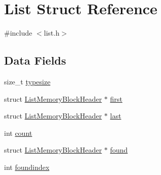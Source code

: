 \hypertarget{struct_list}{\section{List Struct Reference}
\label{struct_list}
}


{\ttfamily \#include $<$list.\-h$>$}

\subsection*{Data Fields}
\begin{DoxyCompactItemize}
\item 
size\-\_\-t \hyperlink{struct_list_aae15b6d77b58dbd6f21861d1320ec961}{typesize}
\item 
struct \hyperlink{struct_list_memory_block_header}{List\-Memory\-Block\-Header} $\ast$ \hyperlink{struct_list_aad341c9d11e18ba0ff4abe71e916bf4c}{first}
\item 
struct \hyperlink{struct_list_memory_block_header}{List\-Memory\-Block\-Header} $\ast$ \hyperlink{struct_list_a512a4382e503046b144aef2735fe7f9d}{last}
\item 
int \hyperlink{struct_list_ad43c3812e6d13e0518d9f8b8f463ffcf}{count}
\item 
struct \hyperlink{struct_list_memory_block_header}{List\-Memory\-Block\-Header} $\ast$ \hyperlink{struct_list_ad2024b5b87cb5f5fb344d1838c49b77f}{found}
\item 
int \hyperlink{struct_list_a6f582e298e6ce683da843212054a65bc}{foundindex}
\end{DoxyCompactItemize}


